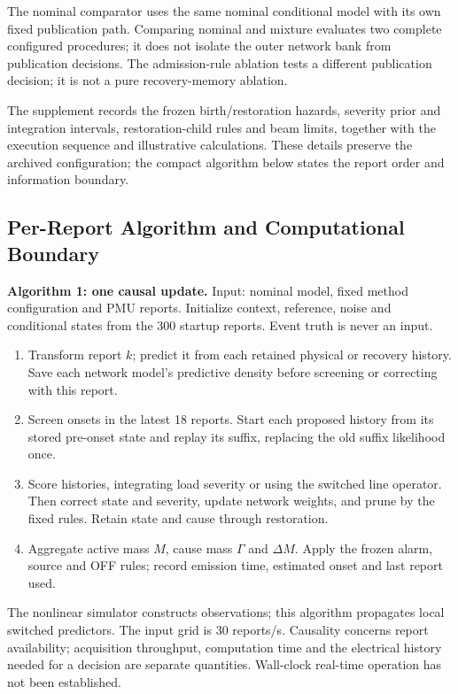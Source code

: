 The nominal comparator uses the same nominal conditional model with its
own fixed publication path. Comparing nominal and mixture evaluates two
complete configured procedures; it does not isolate the outer network bank
from publication decisions. The admission-rule ablation tests a different publication
decision; it is not a pure recovery-memory ablation.

The supplement records the frozen birth/restoration hazards, severity
prior and integration intervals, restoration-child rules and beam limits,
together with the execution sequence and illustrative calculations.
These details preserve the archived configuration; the compact algorithm
below states the report order and information boundary.

\subsection{Per-Report Algorithm and Computational Boundary}

\noindent\textbf{Algorithm 1: one causal update.}
Input: nominal model, fixed method configuration and PMU reports.
Initialize context, reference, noise and conditional states from the 300
startup reports. Event truth is never an input.
\begin{enumerate}
\item Transform report $k$; predict it from each retained physical or
recovery history. Save each network model's predictive density before
screening or correcting with this report.
\item Screen onsets in the latest 18 reports. Start each proposed history
from its stored pre-onset state and replay its suffix, replacing the old
suffix likelihood once.
\item Score histories, integrating load severity or using the switched
line operator. Then correct state and severity, update network weights,
and prune by the fixed rules. Retain state and cause through restoration.
\item Aggregate active mass $M$, cause mass $\Gamma$ and $\Delta M$.
Apply the frozen alarm, source and OFF rules; record emission time,
estimated onset and last report used.
\end{enumerate}
The nonlinear simulator constructs observations; this algorithm propagates
local switched predictors. The input grid is 30 reports/s. Causality
concerns report availability; acquisition throughput, computation time
and the electrical history needed for a decision are separate quantities.
Wall-clock real-time operation has not been established.
